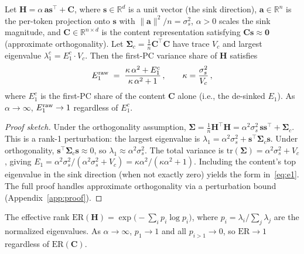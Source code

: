\documentclass[11pt]{article}
\begin{document}
\begin{theorem}[$E_1$ Contamination]\label{thm:e1}
Let $\mathbf{H} = \alpha\,\mathbf{a}\mathbf{s}^\top + \mathbf{C}$, where $\mathbf{s} \in \mathbb{R}^d$ is a unit vector (the sink direction), $\mathbf{a} \in \mathbb{R}^n$ is the per-token projection onto $\mathbf{s}$ with $\|\mathbf{a}\|^2 / n = \sigma_s^2$, $\alpha > 0$ scales the sink magnitude, and $\mathbf{C} \in \mathbb{R}^{n \times d}$ is the content representation satisfying $\mathbf{C}\mathbf{s} \approx \mathbf{0}$ (approximate orthogonality). Let $\boldsymbol{\Sigma}_c = \frac{1}{n}\mathbf{C}^\top\mathbf{C}$ have trace $V_c$ and largest eigenvalue $\lambda_1^c = E_1^c \cdot V_c$. Then the first-PC variance share of $\mathbf{H}$ satisfies
\begin{equation}\label{eq:e1}
    E_1^{\textup{raw}} \;=\; \frac{\kappa\,\alpha^2 + E_1^c}{\kappa\,\alpha^2 + 1}\,,
    \qquad \kappa = \frac{\sigma_s^2}{V_c}\,,
\end{equation}
where $E_1^c$ is the first-PC share of the content $\mathbf{C}$ alone (i.e., the de-sinked $E_1$). As $\alpha \to \infty$, $E_1^{\textup{raw}} \to 1$ regardless of $E_1^c$.
\end{theorem}

\begin{proof}[Proof sketch]
Under the orthogonality assumption, $\boldsymbol{\Sigma} = \frac{1}{n}\mathbf{H}^\top\mathbf{H} = \alpha^2 \sigma_s^2 \,\mathbf{s}\mathbf{s}^\top + \boldsymbol{\Sigma}_c$. This is a rank-1 perturbation: the largest eigenvalue is $\lambda_1 = \alpha^2\sigma_s^2 + \mathbf{s}^\top\boldsymbol{\Sigma}_c\mathbf{s}$. Under orthogonality, $\mathbf{s}^\top\boldsymbol{\Sigma}_c\mathbf{s} \approx 0$, so $\lambda_1 \approx \alpha^2\sigma_s^2$. The total variance is $\text{tr}(\boldsymbol{\Sigma}) = \alpha^2\sigma_s^2 + V_c$, giving $E_1 = \alpha^2\sigma_s^2 / (\alpha^2\sigma_s^2 + V_c) = \kappa\alpha^2 / (\kappa\alpha^2 + 1)$. Including the content's top eigenvalue in the sink direction (when not exactly zero) yields the form in~\eqref{eq:e1}. The full proof handles approximate orthogonality via a perturbation bound (Appendix~\ref{app:proof}).
\end{proof}

\begin{corollary}\label{cor:er}
The effective rank $\mathrm{ER}(\mathbf{H}) = \exp\bigl(-\sum_i p_i \log p_i\bigr)$, where $p_i = \lambda_i / \sum_j \lambda_j$ are the normalized eigenvalues. As $\alpha \to \infty$, $p_1 \to 1$ and all $p_{i>1} \to 0$, so $\mathrm{ER} \to 1$ regardless of $\mathrm{ER}(\mathbf{C})$.
\end{corollary}
\end{document}
